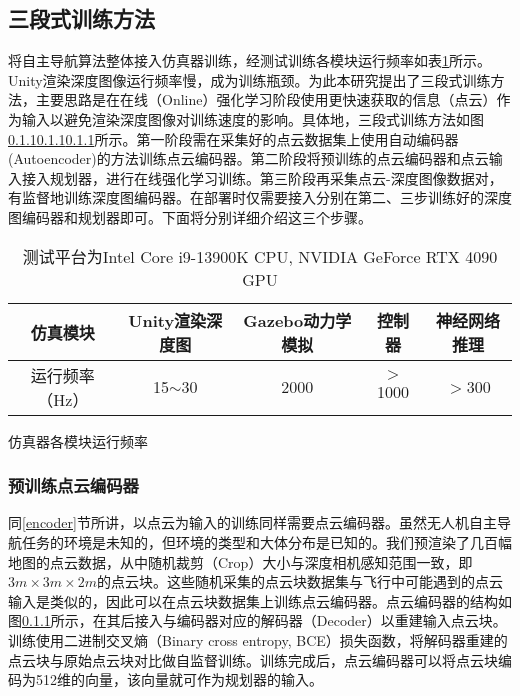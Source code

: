 \subsection{三段式训练方法}
将自主导航算法整体接入仿真器训练，经测试训练各模块运行频率如表\ref{train_freq}所示。Unity渲染深度图像运行频率慢，成为训练瓶颈。为此本研究提出了三段式训练方法，主要思路是在在线（Online）强化学习阶段使用更快速获取的信息（点云）作为输入以避免渲染深度图像对训练速度的影响。具体地，三段式训练方法如图\ref{}\ref{}\ref{}所示。第一阶段需在采集好的点云数据集上使用自动编码器 (Autoencoder)的方法训练点云编码器。第二阶段将预训练的点云编码器和点云输入接入规划器，进行在线强化学习训练。第三阶段再采集点云-深度图像数据对，有监督地训练深度图编码器。在部署时仅需要接入分别在第二、三步训练好的深度图编码器和规划器即可。下面将分别详细介绍这三个步骤。
\begin{table}
  \centering
  \begin{tabular}{ccccc}
      \hline
      \textbf{仿真模块} & \textbf{Unity渲染深度图} & \textbf{Gazebo动力学模拟} & \textbf{控制器} & \textbf{神经网络推理} \\ \hline
      运行频率（Hz） & 15$\sim$30 & 2000 & $>$1000 & $>$300 \\ \hline
  \end{tabular}
  \caption{仿真器各模块运行频率}
  \caption*{测试平台为Intel Core i9-13900K CPU, NVIDIA GeForce RTX 4090 GPU}
  \label{train_freq}
\end{table}

\subsubsection{预训练点云编码器}
同\ref{encoder}节所讲，以点云为输入的训练同样需要点云编码器。虽然无人机自主导航任务的环境是未知的，但环境的类型和大体分布是已知的。我们预渲染了几百幅地图的点云数据，从中随机裁剪（Crop）大小与深度相机感知范围一致，即$3m\times 3m\times 2m$的点云块。这些随机采集的点云块数据集与飞行中可能遇到的点云输入是类似的，因此可以在点云块数据集上训练点云编码器。点云编码器的结构如图\ref{}所示，在其后接入与编码器对应的解码器（Decoder）以重建输入点云块。训练使用二进制交叉熵（Binary cross entropy, BCE）损失函数，将解码器重建的点云块与原始点云块对比做自监督训练。训练完成后，点云编码器可以将点云块编码为512维的向量，该向量就可作为规划器的输入。

